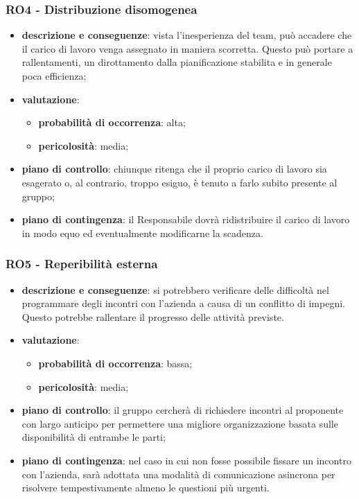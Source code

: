     \subsubsection{RO4 - Distribuzione disomogenea} \label{sec:RO4}
        \begin{itemize}
            \item \textbf{descrizione e conseguenze}: vista l'inesperienza del team, può accadere che il carico di lavoro venga assegnato in maniera scorretta. Questo può portare a rallentamenti, un dirottamento dalla pianificazione stabilita e in generale poca efficienza;
            \item \textbf{valutazione}:
            \begin{itemize} 
                \item \textbf{probabilità di occorrenza}: alta;
                \item \textbf{pericolosità}: media;
            \end{itemize}
            \item \textbf{piano di controllo}: chiunque ritenga che il proprio carico di lavoro sia esagerato o, al contrario, troppo esiguo, è tenuto a farlo subito presente al gruppo;
            \item \textbf{piano di contingenza}: il Responsabile dovrà ridistribuire il carico di lavoro in modo equo ed eventualmente modificarne la scadenza.
        \end{itemize}

    \subsubsection{RO5 - Reperibilità esterna} \label{sec:RO5}
        \begin{itemize}
            \item \textbf{descrizione e conseguenze}: si potrebbero verificare delle difficoltà nel programmare degli incontri con l'azienda a causa di un conflitto di impegni. Questo potrebbe rallentare il progresso delle attività previste.
            \item \textbf{valutazione}:
            \begin{itemize}
                \item \textbf{probabilità di occorrenza}: bassa;
                \item \textbf{pericolosità}: media;
            \end{itemize}
            \item \textbf{piano di controllo}: il gruppo cercherà di richiedere incontri al proponente con largo anticipo per permettere una migliore organizzazione basata sulle disponibilità di entrambe le parti;
            \item \textbf{piano di contingenza}: nel caso in cui non fosse possibile fissare un incontro con l'azienda, sarà adottata una modalità di comunicazione asincrona per risolvere tempestivamente almeno le questioni più urgenti.
        \end{itemize}

